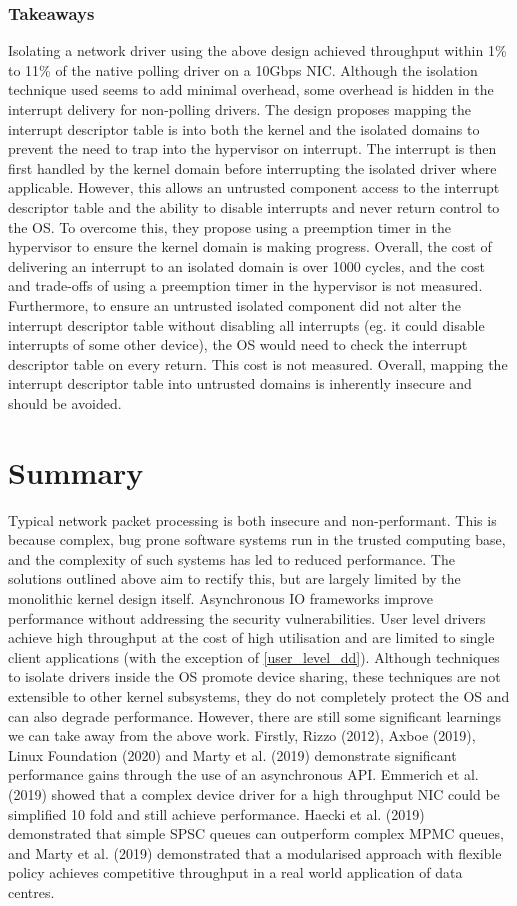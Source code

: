 \subsubsection{Takeaways}
Isolating a network driver using the above design achieved throughput within 1\% to 11\% of the native polling driver on a
10Gbps NIC. Although the isolation technique used seems to add minimal overhead, some overhead is hidden in the interrupt
delivery for non-polling drivers. The design proposes mapping the interrupt descriptor table is into both the kernel
and the isolated domains to prevent the need to trap into the hypervisor on interrupt. The interrupt is
then first handled by the kernel domain before interrupting the isolated driver where applicable. 
However, this allows an untrusted component access to the interrupt descriptor table and the ability to disable interrupts 
and never return control to the OS. To overcome this, they propose using a preemption timer in the hypervisor to ensure the 
kernel domain is making progress. Overall, the cost of delivering an interrupt to an isolated 
domain is over 1000 cycles, and the cost and trade-offs of using a preemption timer
in the hypervisor is not measured. Furthermore, to ensure an untrusted isolated component did not alter the interrupt
descriptor table without disabling all interrupts (eg. it could disable interrupts of some other device), the OS would
need to check the interrupt descriptor table on every return. This cost is not measured. Overall, mapping the interrupt
descriptor table into untrusted domains is inherently insecure and should be avoided. 

\section{Summary}
Typical network packet processing is both insecure and non-performant. This is because complex, bug prone software systems
run in the trusted computing base, and the complexity of such systems has led to reduced performance. The solutions outlined above
aim to rectify this, but are largely limited by the monolithic kernel design itself. 
Asynchronous IO frameworks improve performance without addressing the security vulnerabilities. User level drivers
achieve high throughput at the cost of high utilisation and are limited to single client applications (with the exception of \autoref{user_level_dd}). Although techniques to
isolate drivers inside the OS promote device sharing, these techniques are not extensible to other kernel subsystems, they
do not completely protect the OS and can also degrade performance. However, there are still some significant
learnings we can take away from the above work. Firstly, Rizzo (2012), Axboe (2019), Linux Foundation (2020) and Marty et al. (2019)
demonstrate significant performance gains through the use of an asynchronous API. Emmerich et al. (2019) showed that a complex
device driver for a high throughput NIC could be simplified 10 fold and still achieve performance. Haecki et al. (2019)
demonstrated that simple SPSC queues can outperform complex MPMC queues, and Marty et al. (2019) demonstrated that a
modularised approach with flexible policy achieves competitive throughput in a real world application of data centres.
